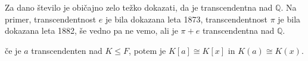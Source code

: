 \documentclass[11pt, a4paper]{article}
\begin{document}
    \begin{remark}
        Za dano število je običajno zelo težko dokazati, da je transcendentna nad \(\mathbb{Q}\). Na primer, transcendentnost \(e\) je bila dokazana leta 1873, transcendentnost \(\pi\) je bila dokazana leta 1882, še vedno pa ne vemo, ali je \(\pi + e\) transcendentna nad \(\mathbb{Q}\).
    \end{remark}

    \begin{theorem}
        če je \(a\) transcendenten nad \(K \le F\), potem je \(K[a] \cong K[x]\) in \(K(a) \cong K(x)\).
    \end{theorem}
\end{document}
